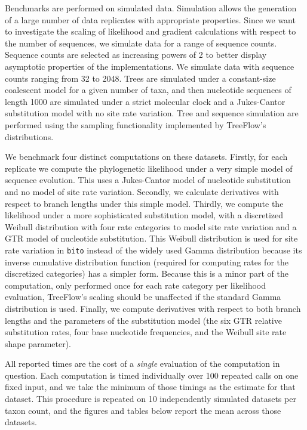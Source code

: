 \documentclass{article}
\begin{document}
Benchmarks are performed on simulated data. Simulation allows the generation of a large number of data replicates with appropriate properties. Since we want to investigate the scaling of likelihood and gradient calculations with respect to the number of sequences, we simulate data for a range of sequence counts. Sequence counts are selected as increasing powers of 2 to better display asymptotic properties of the implementations. We simulate data with sequence counts ranging from 32 to 2048. Trees are simulated under a constant-size coalescent model for a given number of taxa, and then nucleotide sequences of length 1000 are simulated under a strict molecular clock and a Jukes-Cantor substitution model with no site rate variation. Tree and sequence simulation are performed using the sampling functionality implemented by TreeFlow's distributions.

We benchmark four distinct computations on these datasets. Firstly, for each replicate we compute the phylogenetic likelihood under a very simple model of sequence evolution. This uses a Jukes-Cantor model of nucleotide substitution and no model of site rate variation. Secondly, we calculate derivatives with respect to branch lengths under this simple model. Thirdly, we compute the likelihood under a more sophisticated substitution model, with a discretized Weibull distribution with four rate categories to model site rate variation and a GTR model of nucleotide substitution. This Weibull distribution is used for site rate variation in \texttt{bito} instead of the widely used Gamma distribution because its inverse cumulative distribution function (required for computing rates for the discretized categories) has a simpler form. Because this is a minor part of the computation, only performed once for each rate category per likelihood evaluation, TreeFlow's scaling should be unaffected if the standard Gamma distribution is used. Finally, we compute derivatives with respect to both branch lengths and the parameters of the substitution model (the six GTR relative substitution rates, four base nucleotide frequencies, and the Weibull site rate shape parameter).

All reported times are the cost of a \textit{single} evaluation of the computation in question. Each computation is timed individually over 100 repeated calls on one fixed input, and we take the minimum of those timings as the estimate for that dataset. This procedure is repeated on 10 independently simulated datasets per taxon count, and the figures and tables below report the mean across those datasets.
\end{document}
